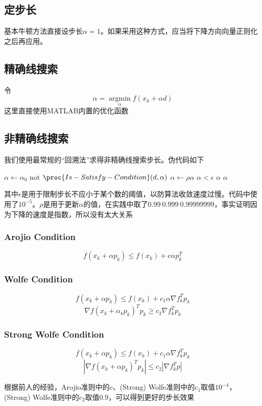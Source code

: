 \documentclass[11pt, a4paper]{article}
\begin{document}
\subsection{定步长}
基本牛顿方法直接设步长$\alpha=1$。如果采用这种方式，应当将下降方向向量正则化之后再应用。

\subsection{精确线搜索}
令\[\alpha=\mathop{\arg \min}\limits_\alpha f(x_k+\alpha d)\]
这里直接使用MATLAB内置的优化函数

\subsection{非精确线搜索}

我们使用最常规的“回溯法”求得非精确线搜索步长。伪代码如下
\begin{codebox}
\li $\alpha\gets\alpha_0$
\li \While not $\proc{Is-Satisfy-Condition}(d,\alpha)$
	\Do
\li		$\alpha\gets\rho\alpha$
\li		\If $\alpha<\epsilon$
\li			\Then  \Return $\alpha$		
		\End
	\End
\li \Return $\alpha$
\end{codebox}

其中$\epsilon$是用于限制步长不应小于某个数的阈值，以防算法收敛速度过慢。代码中使用了$10^{-5}$。$\rho$是用于更新$\alpha$的值，在实践中取了$0.99~0.999~0.99999999$，事实证明因为下降的速度是指数，所以没有太大关系


\subsubsection{Arojio Condition}
\[f(x_k+\alpha p_k)\le f(x_k)+c\alpha p_k^T\]

\subsubsection{Wolfe Condition}
\[f(x_k+\alpha p_k)\le f(x_k)+c_1\alpha\nabla f_k^Tp_k\]
\[\nabla f(x_k+\alpha_kp_k)^Tp_k \ge c_2\nabla f_k^Tp_k\]

\subsubsection{Strong Wolfe Condition}
\[f(x_k+\alpha p_k)\le f(x_k)+c_1\alpha\nabla f_k^Tp_k\]
\[|\nabla f(x_k+\alpha p_k)^Tp_k| \le c_2|\nabla f_k^Tp|\]

根据前人的经验\cite{gilbert1989some}，Arojio准则中的$c$、(Strong) Wolfe准则中的$c_1$取值$10^{-4}$，(Strong) Wolfe准则中的$c_2$取值$0.9$，可以得到更好的步长效果
\end{document}
